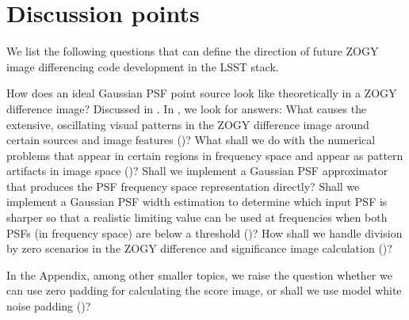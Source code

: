 \section{Discussion points}
We list the following questions that can define the direction of future
ZOGY image differencing code development in the LSST stack.
%
\par How does an ideal Gaussian PSF point source look like theoretically in
a ZOGY difference image? Discussed in .  In
, we look for answers: What causes the extensive,
oscillating visual patterns in the ZOGY difference image around certain
sources and image features ()? What shall we do with the
numerical problems that appear in certain regions in frequency space and
appear as pattern artifacts in image space ()? Shall we
implement a Gaussian PSF approximator that produces the PSF frequency space
representation directly?  Shall we implement a Gaussian PSF width estimation
to determine which input PSF is sharper so that a realistic limiting value
can be used at frequencies when both PSFs (in frequency space) are below a
threshold ()?  How shall we handle
division by zero scenarios in the ZOGY difference and significance image
calculation ()?
%
\par In the Appendix, among other smaller topics, we raise the question whether
we can use zero padding for calculating the score image, or shall we use
model white noise padding ()?
%
